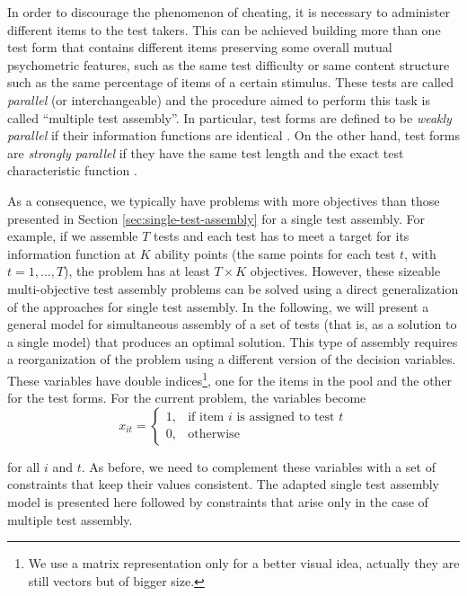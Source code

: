 In order to discourage the phenomenon of cheating, it is necessary to administer different items to the test takers. This can be achieved building more than one test form that contains different items preserving some overall mutual psychometric features, such as the same test difficulty or same content structure such as the same percentage of items of a certain stimulus. These tests are called \emph{parallel} (or interchangeable) and the procedure aimed to perform this task is called ``multiple test assembly''. In particular, test forms are defined to be \emph{weakly parallel} if their information functions are identical \textcite{same77}. On the other hand, test forms are \emph{strongly parallel} if they have the same test length and the exact test characteristic function \textcite{Lord80}.

As a consequence, we typically have problems with more objectives than those presented in Section \ref{sec:single-test-assembly} for a single test assembly. For example, if we assemble $T$ tests and each test has to meet a target for its information function at $K$ ability points (the same points for each test $t$, with $t=1,\dots, T$), the problem has at least $T \times K$ objectives. However, these sizeable multi-objective test assembly problems can be solved using a direct generalization of the approaches for single test assembly. In the following, we will present a general model for simultaneous assembly of a set of tests (that is, as a solution to a single model) that produces an optimal solution.
This type of assembly requires a reorganization of the problem using a different version of the decision variables. These variables have double indices\footnote{We use a matrix representation only for a better visual idea, actually they are still vectors but of bigger size.}, one for the items in the pool and the other for the test forms. For the current problem, the variables become
\begin{equation*}\label{eq:MDV}
x_{it} =
\begin{cases}
1, & \mbox{if item } i \mbox{ is assigned to test }t\\
0, & \mbox{otherwise}
\end{cases}
\end{equation*}

\noindent for all $i$ and $t$. As before, we need to complement these variables with a set of constraints that keep their values consistent. The adapted single test assembly model is presented here followed by constraints that arise only in the case of multiple test assembly.

